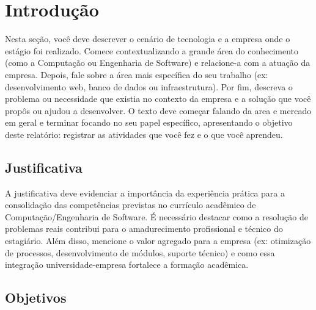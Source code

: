 
\chapter{Introdução}
\label{cap:introducao}


Nesta seção, você deve descrever o cenário de tecnologia e a empresa onde o estágio foi realizado. 
Comece contextualizando a grande área do conhecimento (como a Computação ou Engenharia de Software)
 e relacione-a com a atuação da empresa. Depois, fale sobre a área mais específica do seu trabalho 
 (ex: desenvolvimento web, banco de dados ou infraestrutura). Por fim, descreva o problema ou necessidade
  que existia no contexto da empresa e a solução que você propôs ou ajudou a desenvolver. O texto deve começar 
falando da area e mercado em geral e terminar focando no seu papel específico, apresentando o 
objetivo deste relatório: registrar as atividades que você fez e o que você aprendeu.



\section{Justificativa}
\label{sec:justificativa}

A justificativa deve evidenciar a importância da experiência prática para a 
consolidação das competências previstas no currículo acadêmico de Computação/Engenharia de Software. 
É necessário destacar como a resolução de problemas reais contribui para o amadurecimento profissional 
e técnico do estagiário. Além disso, mencione o valor agregado para a empresa 
(ex: otimização de processos, desenvolvimento de módulos, suporte técnico) e 
como essa integração universidade-empresa fortalece a formação acadêmica.

\section{Objetivos}
\label{sec:objetivos}

